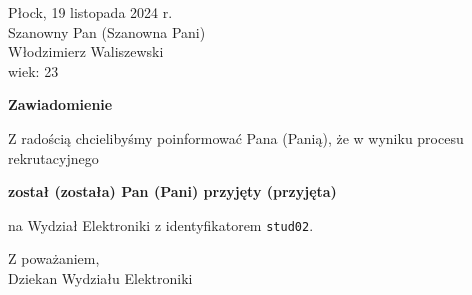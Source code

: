 \documentclass[12pt,a4paper]{article}
\begin{document}
\hfill Płock, 19 listopada 2024 r.\\


\noindent 
Szanowny Pan (Szanowna Pani) \\
Włodzimierz Waliszewski \\
wiek: 23

\bigskip

\begin{center}
	{\Large\textbf{Zawiadomienie}}
\end{center}

\bigskip

Z radością chcielibyśmy poinformować Pana (Panią), że w wyniku procesu rekrutacyjnego 
\begin{center}
\textsf{\textbf{został (została)  Pan (Pani) przyjęty (przyjęta)}} 
\end{center}
na Wydział Elektroniki z identyfikatorem \verb|stud02|. 

\vspace{2cm}

\noindent
Z poważaniem,\\
Dziekan
Wydziału Elektroniki
\end{document}
